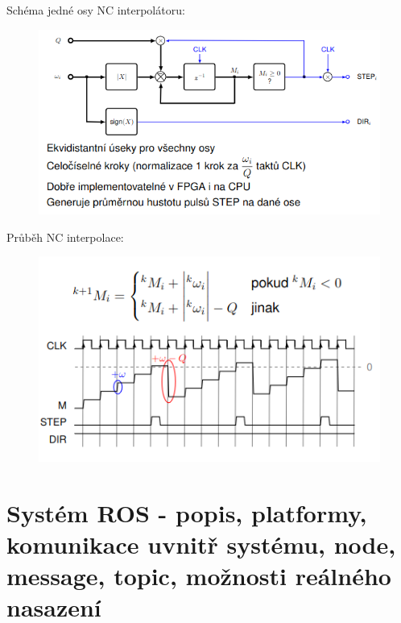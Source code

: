 Schéma jedné osy NC interpolátoru:\\
\begin{figure}[h!]
    \centering
    \includegraphics[scale = 0.5]{img/JednaOsaNC.png}
\end{figure}

Průběh NC interpolace:\\
\begin{figure}[h!]
    \centering
    \includegraphics[scale = 0.5]{img/PrubehNCinterpolace.png}
\end{figure}
\section{Systém ROS - popis, platformy, komunikace uvnitř systému, node, message, topic, možnosti reálného nasazení}
